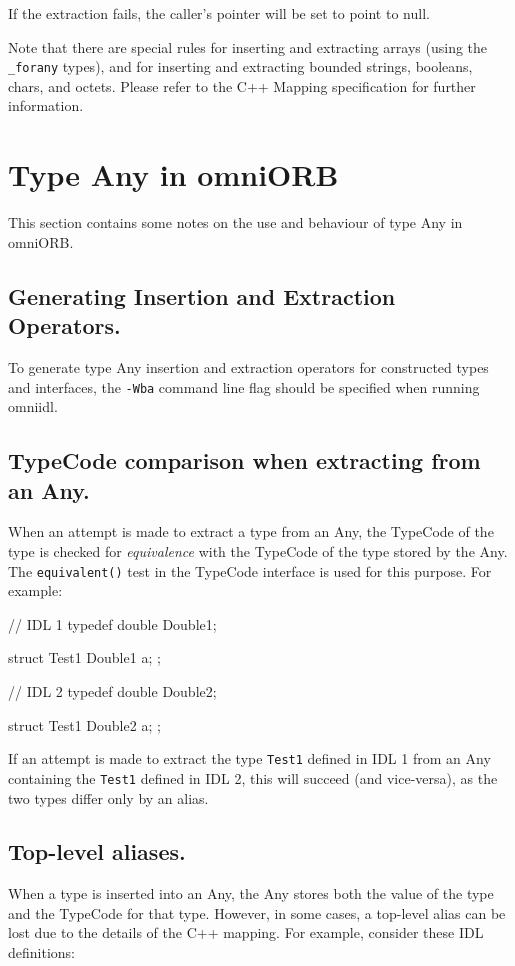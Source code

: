 \documentclass[11pt,oneside,a4paper]{book}
\newcommand{\type}[1]{\texttt{#1}}
\newcommand{\op}[1]{\texttt{#1()}}
\begin{document}
If the extraction fails, the caller's pointer will be set to point to
null.

Note that there are special rules for inserting and extracting arrays
(using the \type{\_forany} types), and for inserting and extracting
bounded strings, booleans, chars, and octets. Please refer to the C++
Mapping specification for further information.



\section{Type Any in omniORB}
\label{anyOmniORB}

This section contains some notes on the use and behaviour of type Any
in omniORB.

\subsection{Generating Insertion and Extraction Operators.}
To generate type Any insertion and extraction operators for
constructed types and interfaces, the \texttt{-Wba} command line flag
should be specified when running omniidl.

\subsection{TypeCode comparison when extracting from an Any.}
When an attempt is made to extract a type from an Any, the TypeCode of
the type is checked for \emph{equivalence} with the TypeCode of the
type stored by the Any. The \op{equivalent} test in the TypeCode
interface is used for this purpose. For example:

\begin{idllisting}
// IDL 1
typedef double Double1;

struct Test1 {
  Double1 a;
};
\end{idllisting}

\begin{idllisting}
// IDL 2
typedef double Double2;

struct Test1 {
  Double2 a;
};
\end{idllisting}
    
If an attempt is made to extract the type \type{Test1} defined in IDL
1 from an Any containing the \type{Test1} defined in IDL 2, this will
succeed (and vice-versa), as the two types differ only by an alias.

\subsection{Top-level aliases.}
When a type is inserted into an Any, the Any stores both the value of
the type and the TypeCode for that type. However, in some cases, a
top-level alias can be lost due to the details of the C++ mapping. For
example, consider these IDL definitions:
\end{document}
